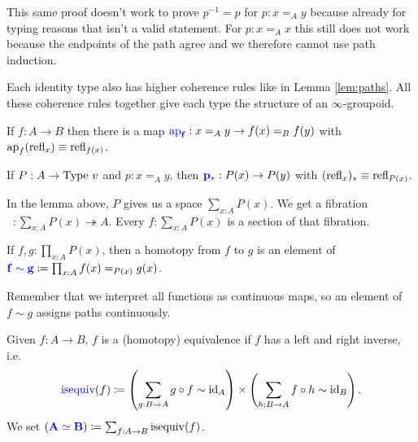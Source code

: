 \begin{rem}
    This same proof doesn't work to prove $p^{-1} = p$ for $p : x \mathrel{=_A} y$ because already for typing reasons that isn't a valid statement. 
    For $p : x \mathrel{=_A} x$ this still does not work because the endpoints of the path agree and we therefore cannot use path induction.
\end{rem}

\begin{rem}
    Each identity type also has higher coherence rules like in Lemma \ref{lem:paths}. 
    All these coherence rules together give each type the structure of an $\infty$-groupoid.
\end{rem}

\begin{boxlem}
    If $f : A \to B$ then there is a map $\alert{\mathop{\operatorname{ap}_f}} : x \mathrel{=_A} y \to f(x) \mathrel{=_B} f(y)$ with $\mathop{\operatorname{ap}_f}(\operatorname{refl}_{x}) \equiv \operatorname{refl}_{f(x)}$.
\end{boxlem}

\begin{boxlem}
    If $P : A \to \mathrm{Type}\ v$ and $p : x \mathrel{=_A} y$, then $\alert{p_*} : P(x) \to P(y)$ with $(\operatorname{refl}_{x})_* \equiv \operatorname{refl}_{P(x)}$.
\end{boxlem}

\begin{rem}
    In the lemma above, $P$ gives us a space $\sum_{x : A} P(x)$. 
    We get a fibration $\mathop{\pi_1} : \sum_{x : A} P(x) \twoheadrightarrow A$. 
    Every $f : \sum_{x : A} P(x)$ is a section of that fibration. 
\end{rem}

\begin{boxdefi}
    If $f, g : \prod_{x : A} P(x)$, then a \alert{homotopy} from $f$ to $g$ is an element of $\alert{f \sim g} \coloneq \prod_{x : A} f(x) \mathrel{=_{P(x)}} g(x)$.
\end{boxdefi}

\begin{rem}
    Remember that we interpret all functions as continuous maps, so an element of $f \sim g$ assigns paths continuously. 
\end{rem}

\begin{boxdefi}
    Given $f : A \to B$, $f$ is a \alert{(homotopy) equivalence} if $f$ has a left and right inverse, i.e.\
    \begin{equation*}
        \alert{\operatorname{isequiv}}(f) \coloneq \left( \sum_{g : B \to A} g \circ f \sim \id_A \right) \times \left( \sum_{h : B \to A} f \circ h \sim \id_B \right).
    \end{equation*}
    We set $(\alert{A \simeq B}) \coloneq \sum_{f : A \to B} \operatorname{isequiv}(f)$.
\end{boxdefi}

